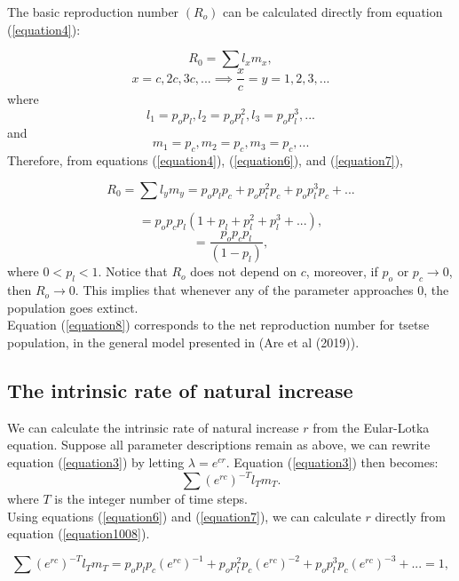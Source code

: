 \documentclass[10pt,a4paper]{article}
\begin{document}
The basic reproduction number $(R_o)$ can be calculated directly from equation (\ref{equation4}): 

$$R_{0 }=\sum l_{x}m_{x},$$
$$x=c,2c,3c,... \implies \frac{x}{c}=y = 1,2,3,...$$ 
where
\begin{equation}
\label{equation6} 
l_{1}=p_op_l, l_{2}= p_op_l^2, l_{3}=p_op_l^3, . . .
\end{equation}
and
\begin{equation}
\label{equation7} 
m_{1}=p_c, m_{2}=p_c, m_{3}=p_c, . . .
\end{equation}
Therefore, from equations (\ref{equation4}),  (\ref{equation6}), and  (\ref{equation7}),

$$R_{0 }=\sum l_{y}m_{y} = p_op_lp_c + p_op_l^2 p_c + p_op_l^3p_c + ...$$

$$=p_op_cp_l (1 + p_l + p_l^2 + p_l^3 + ...),$$
\begin{equation}
\label{equation8} 
=\frac{p_op_cp_l}{(1-p_l)},
\end{equation}
where $0 < p_l < 1$. Notice that $R_o$ does not depend on $c$, moreover, if $p_o$ or $p_c \rightarrow{0}$, then $R_o \rightarrow{0}$. This implies that whenever any of the parameter approaches $0$, the population goes extinct. \\

Equation  (\ref{equation8}) corresponds to the net reproduction number for tsetse population, in the general model presented in (Are et al (2019)).

\subsection*{The intrinsic rate of natural increase}
We can calculate the intrinsic rate of natural increase $r$ from the  Eular-Lotka equation.  Suppose all parameter descriptions remain as above, we can rewrite equation (\ref{equation3}) by letting $\lambda= e^{cr}$. Equation (\ref{equation3}) then becomes:
\begin{equation}
\label{equation1008} 
\sum (e^{rc})^{-T}l_{T}m_{T}.
\end{equation}
where $ T $ is the integer number of time steps. \\

Using equations  (\ref{equation6}) and  (\ref{equation7}), we can calculate $r$ directly from equation (\ref{equation1008}).

$$\sum (e^{rc})^{-T}l_{T}m_{T} = p_op_lp_c(e^{rc})^{-1} + p_op_l^2p_c(e^{rc})^{-2} + p_op_l^3p_c(e^{rc})^{-3} + ...=1,$$
\end{document}
